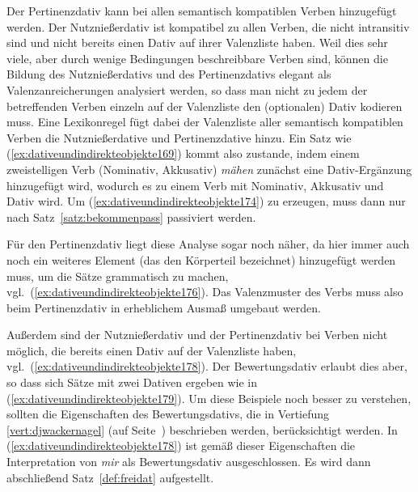 
Der Pertinenzdativ kann bei allen semantisch kompatiblen Verben hinzugefügt werden.
Der Nutznießerdativ ist kompatibel zu allen Verben, die nicht intransitiv sind und nicht bereits einen Dativ auf ihrer Valenzliste haben.
Weil dies sehr viele, aber durch wenige Bedingungen beschreibbare Verben sind, können die Bildung des Nutznießerdativs und des Pertinenzdativs elegant als Valenzanreicherungen analysiert werden, so dass man nicht zu jedem der betreffenden Verben einzeln auf der Valenzliste den (optionalen) Dativ kodieren muss.
Eine Lexikonregel fügt dabei der Valenzliste aller semantisch kompatiblen Verben die Nutznießerdative und Pertinenzdative hinzu.
Ein Satz wie (\ref{ex:dativeundindirekteobjekte169}) kommt also zustande, indem einem zweistelligen Verb (Nominativ, Akkusativ) \textit{mähen} zunächst eine Dativ-Ergänzung hinzugefügt wird, wodurch es zu einem Verb mit Nominativ,  Akkusativ und Dativ wird.
Um (\ref{ex:dativeundindirekteobjekte174}) zu erzeugen, muss dann nur nach Satz~\ref{satz:bekommenpass} passiviert werden.

Für den Pertinenzdativ liegt diese Analyse sogar noch näher, da hier immer auch noch ein weiteres Element (das den Körperteil bezeichnet) hinzugefügt werden muss, um die Sätze grammatisch zu machen, vgl.\ (\ref{ex:dativeundindirekteobjekte176}).
Das Valenzmuster des Verbs muss also beim Pertinenzdativ in erheblichem Ausmaß umgebaut werden.

\begin{exe}
\end{exe}

Außerdem sind der Nutznießerdativ und der Pertinenzdativ bei Verben nicht möglich, die bereits einen Dativ auf der Valenzliste haben, vgl.\ (\ref{ex:dativeundindirekteobjekte178}).
Der Bewertungsdativ erlaubt dies aber, so dass sich Sätze mit zwei Dativen ergeben wie in (\ref{ex:dativeundindirekteobjekte179}).
Um diese Beispiele noch besser zu verstehen, sollten die Eigenschaften des Bewertungsdativs, die in Vertiefung \ref{vert:djwackernagel} (auf Seite~\pageref{vert:djwackernagel}) beschrieben werden, berücksichtigt werden.
In (\ref{ex:dativeundindirekteobjekte178}) ist gemäß dieser Eigenschaften die Interpretation von \textit{mir} als Bewertungsdativ ausgeschlossen.
Es wird dann abschließend Satz~\ref{def:freidat} aufgestellt.

\begin{exe}
  \ex\label{ex:dativeundindirekteobjekte177}
  \begin{xlist}
  \end{xlist}
\end{exe}


